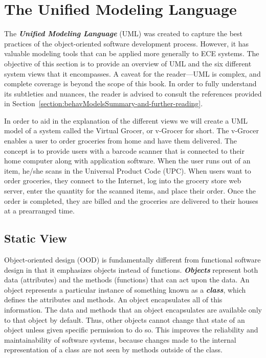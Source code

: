 \section{The Unified Modeling Language}
\label{section:the-unified-modeling-language}

The \emph{\textbf{Unified Modeling Language}} (UML) was created to
capture the best practices of the object-oriented software development
process. However, it has valuable modeling tools that can be applied
more generally to ECE systems. The objective of this section is to
provide an overview of UML and the six different system views that it
encompasses. A caveat for the reader---UML is complex, and complete
coverage is beyond the scope of this book. In order to fully understand
its subtleties and nuances, the reader is advised to consult the
references provided in Section~\ref{section:behavModelsSummary-and-further-reading}.

In order to aid in the explanation of the different views we will create
a UML model of a system called the Virtual Grocer, or v-Grocer for
short. The v-Grocer enables a user to order groceries from home and have
them delivered. The concept is to provide users with a barcode scanner
that is connected to their home computer along with application
software. When the user runs out of an item, he/she scans in the
Universal Product Code (UPC). When users want to order groceries, they
connect to the Internet, log into the grocery store web server, enter
the quantity for the scanned items, and place their order. Once the
order is completed, they are billed and the groceries are delivered to
their houses at a prearranged time.

\subsection{Static View}
\label{subsection:static-view}

Object-oriented design (OOD) is fundamentally different from functional
software design in that it emphasizes objects instead of functions.
\emph{\textbf{Objects}} represent both data (attributes) and the methods
(functions) that can act upon the data. An object represents a
particular instance of something known as a \emph{\textbf{class}}, which
defines the attributes and methods. An object encapsulates all of this
information. The data and methods that an object encapsulates are
available only to that object by default. Thus, other objects cannot
change that state of an object unless given specific permission to do
so. This improves the reliability and maintainability of software
systems, because changes made to the internal representation of a class
are not seen by methods outside of the class.

